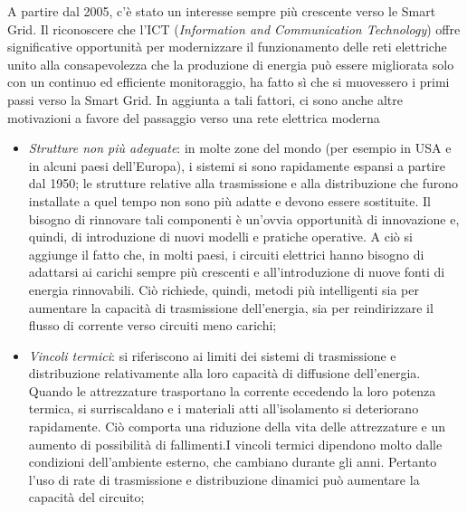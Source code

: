 A partire dal 2005, c'è stato un interesse sempre più crescente verso le Smart Grid. Il riconoscere che l'ICT (\textit{Information and Communication Technology}) offre significative opportunità per modernizzare il funzionamento delle reti elettriche unito alla consapevolezza che la produzione di energia può essere migliorata solo con un continuo ed efficiente monitoraggio, ha fatto sì che si muovessero i primi passi verso la Smart Grid. In aggiunta a tali fattori, ci sono anche altre motivazioni a favore del passaggio verso una rete elettrica moderna \cite{smartgrid}
\begin{itemize}
\item \textit{Strutture non più adeguate}: in molte zone del mondo (per esempio in USA e in alcuni paesi dell'Europa), i sistemi si sono rapidamente espansi a partire dal 1950; le strutture relative alla trasmissione e alla distribuzione che furono installate a quel tempo non sono più adatte e devono essere sostituite. \newline Il bisogno di rinnovare tali componenti è un'ovvia opportunità di innovazione e, quindi, di introduzione di nuovi modelli e pratiche operative. \newline A ciò si aggiunge il fatto che, in molti paesi, i circuiti elettrici hanno bisogno di adattarsi ai carichi sempre più crescenti e all'introduzione di nuove fonti di energia rinnovabili. Ciò richiede, quindi, metodi più intelligenti sia per aumentare la capacità di trasmissione dell'energia, sia per reindirizzare il flusso di corrente verso circuiti meno carichi;

\item \textit{Vincoli termici}: si riferiscono ai limiti dei sistemi di trasmissione e distribuzione relativamente alla loro capacità di diffusione dell'energia. Quando le attrezzature trasportano la corrente eccedendo la loro potenza termica, si surriscaldano e i materiali atti all'isolamento si deteriorano rapidamente. Ciò comporta una riduzione della vita delle attrezzature e un aumento di possibilità di fallimenti.\newline I vincoli termici dipendono molto dalle condizioni dell'ambiente esterno, che cambiano durante gli anni. Pertanto l'uso di rate di trasmissione e distribuzione dinamici può aumentare la capacità del circuito;




\end{itemize}
